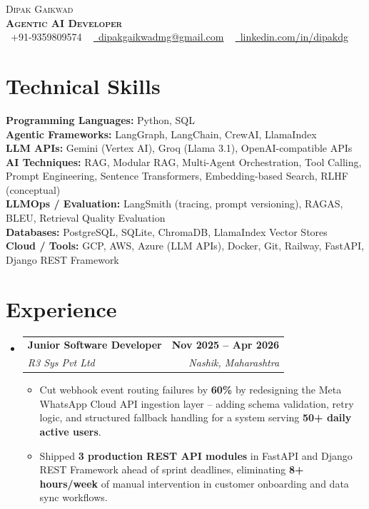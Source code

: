 \documentclass[letterpaper,11pt]{article}
\makeatletter
\newcommand{\resumeItem}[1]{\item\small{{#1 \vspace{-2pt}}}}
\newcommand{\resumeSubheading}[4]{
  \vspace{-2pt}\item
    \begin{tabular*}{1.0\textwidth}[t]{l@{\extracolsep{\fill}}r}
      \textbf{#1} & \textbf{\small #2} \\
      \textit{\small#3} & \textit{\small #4} \\
    \end{tabular*}\vspace{-6pt}
}
\newcommand{\resumeItemListStart}{\begin{itemize}}
\newcommand{\resumeItemListEnd}{\end{itemize}\vspace{-5pt}}
\newcommand{\resumeSubHeadingListStart}{\begin{itemize}[leftmargin=0.0in, label={}]}
\newcommand{\resumeSubHeadingListEnd}{\end{itemize}}
\makeatother
\begin{document}
\begin{center}
    {\Huge \scshape Dipak Gaikwad} \\ \vspace{4pt}
    \textbf{\Large \scshape Agentic AI Developer} \\ \vspace{4pt}
    \small \faPhone\ +91-9359809574 ~
    \href{mailto:dipakgaikwadmg@gmail.com}{\faEnvelope\ \underline{dipakgaikwadmg@gmail.com}} ~
    \href{https://www.linkedin.com/in/dipakdg/}{\faLinkedin\ \underline{linkedin.com/in/dipakdg}}
\end{center}


\section{Technical Skills}
\small
\textbf{Programming Languages:} Python, SQL \\[2pt]
\textbf{Agentic Frameworks:} LangGraph, LangChain, CrewAI, LlamaIndex \\[2pt]
\textbf{LLM APIs:} Gemini (Vertex AI), Groq (Llama 3.1), OpenAI-compatible APIs \\[2pt]
\textbf{AI Techniques:} RAG, Modular RAG, Multi-Agent Orchestration, Tool Calling, Prompt Engineering, Sentence Transformers, Embedding-based Search, RLHF (conceptual) \\[2pt]
\textbf{LLMOps / Evaluation:} LangSmith (tracing, prompt versioning), RAGAS, BLEU, Retrieval Quality Evaluation \\[2pt]
\textbf{Databases:} PostgreSQL, SQLite, ChromaDB, LlamaIndex Vector Stores \\[2pt]
\textbf{Cloud / Tools:} GCP, AWS, Azure (LLM APIs), Docker, Git, Railway, FastAPI, Django REST Framework \\[2pt]

\section{Experience}
\resumeSubHeadingListStart
  \resumeSubheading
    {Junior Software Developer}{Nov 2025 -- Apr 2026}
    {R3 Sys Pvt Ltd}{Nashik, Maharashtra}
  \resumeItemListStart
    \resumeItem{Cut webhook event routing failures by \textbf{60\%} by redesigning the Meta WhatsApp Cloud API ingestion layer -- adding schema validation, retry logic, and structured fallback handling for a system serving \textbf{50+ daily active users}.}
    \resumeItem{Shipped \textbf{3 production REST API modules} in FastAPI and Django REST Framework ahead of sprint deadlines, eliminating \textbf{8+ hours/week} of manual intervention in customer onboarding and data sync workflows.}
  \resumeItemListEnd
\resumeSubHeadingListEnd
\end{document}
